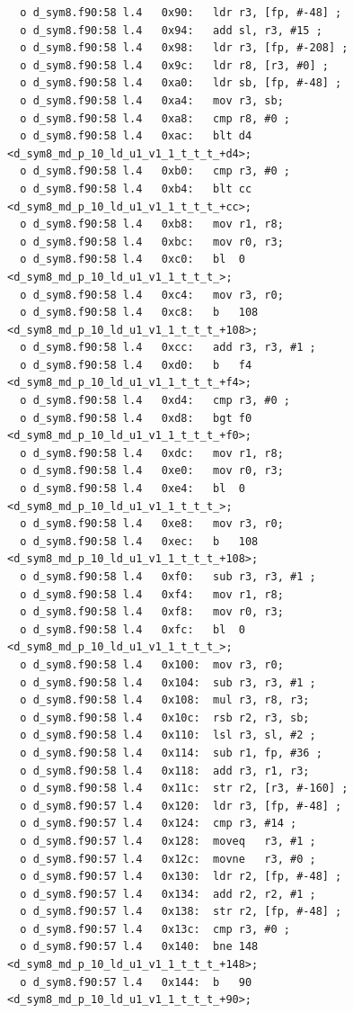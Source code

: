 \documentclass[11pt, a4paper, twoside]{montblanc2}
\begin{document}
\begin{footnotesize}
\begin{verbatim}
  o d_sym8.f90:58 l.4   0x90:	ldr	r3, [fp, #-48] ;
  o d_sym8.f90:58 l.4   0x94:	add	sl, r3, #15 ;
  o d_sym8.f90:58 l.4   0x98:	ldr	r3, [fp, #-208] ;
  o d_sym8.f90:58 l.4   0x9c:	ldr	r8, [r3, #0] ;
  o d_sym8.f90:58 l.4   0xa0:	ldr	sb, [fp, #-48] ;
  o d_sym8.f90:58 l.4   0xa4:	mov	r3, sb;
  o d_sym8.f90:58 l.4   0xa8:	cmp	r8, #0 ;
  o d_sym8.f90:58 l.4   0xac:	blt	d4 <d_sym8_md_p_10_ld_u1_v1_1_t_t_t_+d4>;
  o d_sym8.f90:58 l.4   0xb0:	cmp	r3, #0 ;
  o d_sym8.f90:58 l.4   0xb4:	blt	cc <d_sym8_md_p_10_ld_u1_v1_1_t_t_t_+cc>;
  o d_sym8.f90:58 l.4   0xb8:	mov	r1, r8;
  o d_sym8.f90:58 l.4   0xbc:	mov	r0, r3;
  o d_sym8.f90:58 l.4   0xc0:	bl	0 <d_sym8_md_p_10_ld_u1_v1_1_t_t_t_>;
  o d_sym8.f90:58 l.4   0xc4:	mov	r3, r0;
  o d_sym8.f90:58 l.4   0xc8:	b	108 <d_sym8_md_p_10_ld_u1_v1_1_t_t_t_+108>;
  o d_sym8.f90:58 l.4   0xcc:	add	r3, r3, #1 ;
  o d_sym8.f90:58 l.4   0xd0:	b	f4 <d_sym8_md_p_10_ld_u1_v1_1_t_t_t_+f4>;
  o d_sym8.f90:58 l.4   0xd4:	cmp	r3, #0 ;
  o d_sym8.f90:58 l.4   0xd8:	bgt	f0 <d_sym8_md_p_10_ld_u1_v1_1_t_t_t_+f0>;
  o d_sym8.f90:58 l.4   0xdc:	mov	r1, r8;
  o d_sym8.f90:58 l.4   0xe0:	mov	r0, r3;
  o d_sym8.f90:58 l.4   0xe4:	bl	0 <d_sym8_md_p_10_ld_u1_v1_1_t_t_t_>;
  o d_sym8.f90:58 l.4   0xe8:	mov	r3, r0;
  o d_sym8.f90:58 l.4   0xec:	b	108 <d_sym8_md_p_10_ld_u1_v1_1_t_t_t_+108>;
  o d_sym8.f90:58 l.4   0xf0:	sub	r3, r3, #1 ;
  o d_sym8.f90:58 l.4   0xf4:	mov	r1, r8;
  o d_sym8.f90:58 l.4   0xf8:	mov	r0, r3;
  o d_sym8.f90:58 l.4   0xfc:	bl	0 <d_sym8_md_p_10_ld_u1_v1_1_t_t_t_>;
  o d_sym8.f90:58 l.4   0x100:	mov	r3, r0;
  o d_sym8.f90:58 l.4   0x104:	sub	r3, r3, #1 ;
  o d_sym8.f90:58 l.4   0x108:	mul	r3, r8, r3;
  o d_sym8.f90:58 l.4   0x10c:	rsb	r2, r3, sb;
  o d_sym8.f90:58 l.4   0x110:	lsl	r3, sl, #2 ;
  o d_sym8.f90:58 l.4   0x114:	sub	r1, fp, #36 ;
  o d_sym8.f90:58 l.4   0x118:	add	r3, r1, r3;
  o d_sym8.f90:58 l.4   0x11c:	str	r2, [r3, #-160] ;
  o d_sym8.f90:57 l.4   0x120:	ldr	r3, [fp, #-48] ;
  o d_sym8.f90:57 l.4   0x124:	cmp	r3, #14 ;
  o d_sym8.f90:57 l.4   0x128:	moveq	r3, #1 ;
  o d_sym8.f90:57 l.4   0x12c:	movne	r3, #0 ;
  o d_sym8.f90:57 l.4   0x130:	ldr	r2, [fp, #-48] ;
  o d_sym8.f90:57 l.4   0x134:	add	r2, r2, #1 ;
  o d_sym8.f90:57 l.4   0x138:	str	r2, [fp, #-48] ;
  o d_sym8.f90:57 l.4   0x13c:	cmp	r3, #0 ;
  o d_sym8.f90:57 l.4   0x140:	bne	148 <d_sym8_md_p_10_ld_u1_v1_1_t_t_t_+148>;
  o d_sym8.f90:57 l.4   0x144:	b	90 <d_sym8_md_p_10_ld_u1_v1_1_t_t_t_+90>;

\end{verbatim}
\end{footnotesize}
\end{document}
